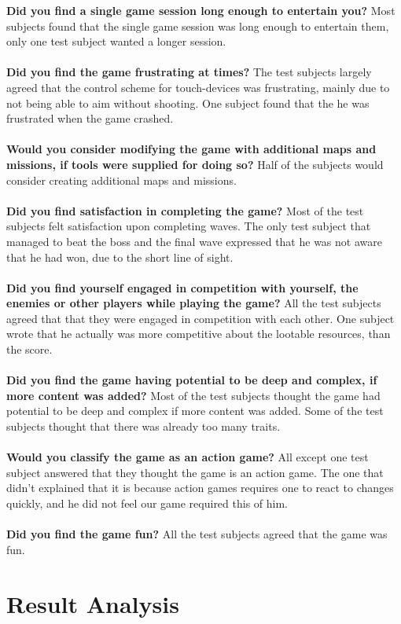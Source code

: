 \textbf{Did you find a single game session long enough to entertain you?}
Most subjects found that the single game session was long enough to entertain them, only one test subject wanted a longer session.\\\\
\textbf{Did you find the game frustrating at times?}
The test subjects largely agreed that the control scheme for touch-devices was frustrating, mainly due to not being able to aim without shooting.
One subject found that the he was frustrated when the game crashed.\\\\
\textbf{Would you consider modifying the game with additional maps and missions, if tools were supplied for doing so?}
Half of the subjects would consider creating additional maps and missions.\\\\
\textbf{Did you find satisfaction in completing the game?}
Most of the test subjects felt satisfaction upon completing waves.
The only test subject that managed to beat the boss and the final wave expressed that he was not aware that he had won, due to the short line of sight.\\\\
\textbf{Did you find yourself engaged in competition with yourself, the enemies or other players while playing the game?}
All the test subjects agreed that that they were engaged in competition with each other.
One subject wrote that he actually was more competitive about the lootable resources, than the score.\\\\
\textbf{Did you find the game having potential to be deep and complex, if more content was added?}
Most of the test subjects thought the game had potential to be deep and complex if more content was added.
Some of the test subjects thought that there was already too many traits.\\\\
\textbf{Would you classify the game as an action game?}
All except one test subject answered that they thought the game is an action game.
The one that didn't explained that it is because action games requires one to react to changes quickly, and he did not feel our game required this of him.\\\\
\textbf{Did you find the game fun?}
All the test subjects agreed that the game was fun.

\section{Result Analysis}
